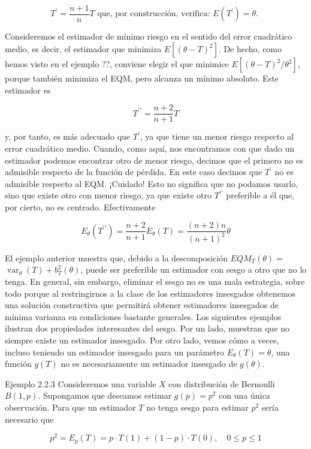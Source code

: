 \documentclass[
]{article}
\begin{document}
\[
T^{\prime}=\frac{n+1}{n} T \text { que, por construcción, verifica: } E\left(T^{\prime}\right)=\theta \text {. }
\]

Consideremos el estimador de mínimo riesgo en el sentido del error cuadrático medio, es decir, el estimador que minimiza \(E\left[(\theta-T)^{2}\right]\). De hecho, como hemos visto en el ejemplo ??, conviene elegir el que minimice \(E\left[(\theta-T)^{2} / \theta^{2}\right]\), porque también minimiza el EQM, pero alcanza un mínimo absoluto. Este estimador es

\[
T^{\prime \prime}=\frac{n+2}{n+1} T
\]

y, por tanto, es más adecuado que \(T^{\prime}\), ya que tiene un menor riesgo respecto al error cuadrático medio.
Cuando, como aquí, nos encontramos con que dado un estimador podemos encontrar otro de menor riesgo, decimos que el primero no es admisible respecto de la función de pérdida. En este caso decimos que \(T^{\prime}\) no es admisible respecto al EQM. ¡Cuidado! Esto no significa que no podamos usarlo, sino que existe otro con menor riesgo, ya que existe otro \(T^{\prime \prime}\) preferible a él que, por cierto, no es centrado. Efectivamente

\[
E_{\theta}\left(T^{\prime \prime}\right)=\frac{n+2}{n+1} E_{\theta}(T)=\frac{(n+2) n}{(n+1)^{2}} \theta
\]

El ejemplo anterior muestra que, debido a la descomposición \(E Q M_{T}(\theta)=\) \(\operatorname{var}_{\theta}(T)+b_{T}^{2}(\theta)\), puede ser preferible un estimador con sesgo a otro que no lo tenga.
En general, sin embargo, eliminar el sesgo no es una mala estrategia, sobre todo porque al restringirnos a la clase de los estimadores insesgados obtenemos una solución constructiva que permitirá obtener estimadores insesgados de mínima varianza en condiciones bastante generales.
Los siguientes ejemplos ilustran dos propiedades interesantes del sesgo. Por un lado, muestran que no siempre existe un estimador insesgado. Por otro lado, vemos cómo a veces, incluso teniendo un estimador insesgado para un parámetro \(E_{\theta}(T)=\theta\), una función \(g(T)\) no es necesariamente un estimador insesgado de \(g(\theta)\).

Ejemplo 2.2.3 Consideremos una variable \(X\) con distribución de Bernoulli \(B(1, p)\). Supongamos que deseamos estimar \(g(p)=p^{2}\) con una única observación. Para que un estimador \(T\) no tenga sesgo para estimar \(p^{2}\) sería necesario que

\[
p^{2}=E_{p}(T)=p \cdot T(1)+(1-p) \cdot T(0), \quad 0 \leq p \leq 1
\]
\end{document}

